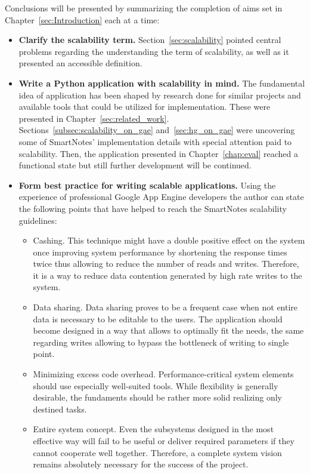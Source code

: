 Conclusions will be presented by summarizing the completion of aims set in Chapter~\ref{sec:Introduction} each at a time:
\begin{itemize}
\item{\textbf{Clarify the scalability term.} Section~\ref{sec:scalability} pointed central problems regarding the understanding the term of scalability, as well as it presented an accessible definition.}
\item{\textbf{Write a Python application with scalability in mind.} The fundamental idea of application has been shaped by research done for similar projects and available tools that could be utilized for implementation. These were presented in Chapter~\ref{sec:related_work}. Sections~\ref{subsec:scalability_on_gae} and~\ref{sec:hg_on_gae} were uncovering some of SmartNotes' implementation details with special attention paid to scalability. Then, the application presented in Chapter~\ref{chap:eval} reached a functional state but still further development will be continued.}
\item{\textbf{Form best practice for writing scalable applications.} Using the experience of professional Google App Engine developers \cite{gae_best_practices, mike_malone_quote} the author can state the following points that have helped to reach the SmartNotes scalability guidelines:
\begin{itemize}
\item{Cashing. This technique might have a double positive effect on the system once improving system performance by shortening the response times twice thus allowing to reduce the number of reads and writes. Therefore, it is a way to reduce data contention generated by high rate writes to the system.}
\item{Data sharing. Data sharing proves to be a frequent case when not entire data is necessary to be editable to the users. The application should become designed in a way that allows to optimally fit the needs, the same regarding writes allowing to bypass the bottleneck of writing to single point.}
\item{Minimizing excess code overhead. Performance-critical system elements should use especially well-suited tools. While flexibility is generally desirable, the fundaments should be rather more solid realizing only destined tasks.}
\item{Entire system concept. Even the subsystems designed in the most effective way will fail to be useful or deliver required parameters if they cannot cooperate well together. Therefore, a complete system vision remains absolutely necessary for the success of the project.}
\end{itemize}
}
\end{itemize} 
